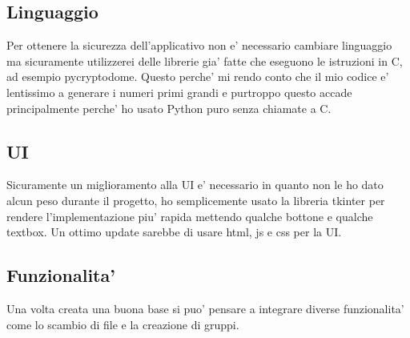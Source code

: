 \subsection{Linguaggio}
Per ottenere la sicurezza dell'applicativo non e' necessario cambiare linguaggio ma sicuramente
utilizzerei delle librerie gia' fatte che eseguono le istruzioni in C, ad esempio pycryptodome.
Questo perche' mi rendo conto che il mio codice e' lentissimo a generare i numeri primi grandi e
purtroppo questo accade principalmente perche' ho usato Python puro senza chiamate a C.

\subsection{UI}
Sicuramente un miglioramento alla UI e' necessario in quanto non le ho dato alcun peso durante il
progetto, ho semplicemente usato la libreria tkinter per rendere l'implementazione piu' rapida
mettendo qualche bottone e qualche textbox. Un ottimo update sarebbe di usare html, js e css per la
UI.

\subsection{Funzionalita'}
Una volta creata una buona base si puo' pensare a integrare diverse funzionalita' come lo scambio di
file e la creazione di gruppi.
